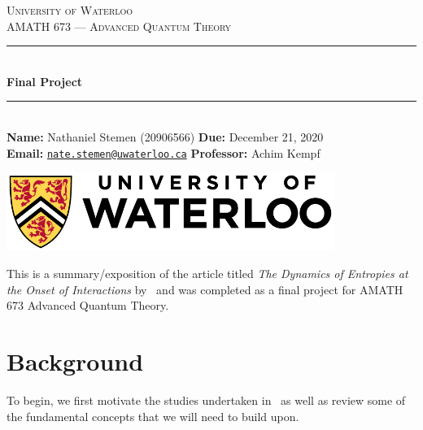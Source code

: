 \documentclass[11pt,english]{article}
\theoremstyle{definition}
\begin{document}
\begin{titlepage}
	\newcommand{\HRule}{\rule{\linewidth}{0.5mm}}

	\begin{center}

		\textsc{\LARGE University of Waterloo}\\[1.5cm]

		\textsc{\large AMATH 673 --- Advanced Quantum Theory}\\[0.75cm]

		\HRule{}\\[0.4cm]

		{\huge\bfseries Final Project}\\[0.15cm]

		\HRule{}\\[1cm]

		{\large
		\textbf{Name:} Nathaniel Stemen (20906566)\hspace{\fill} \textbf{Due:} December 21, 2020 \\
		\textbf{Email:} \href{mailto:nate.stemen@uwaterloo.ca}{\texttt{nate.stemen@uwaterloo.ca}} \hspace{\fill} \textbf{Professor:} Achim Kempf
		}

		\vfill
		\includegraphics[width=0.8\textwidth]{uwlogo.jpg}\\[1cm]
	\end{center}
\end{titlepage}

\begingroup
{}
\hypersetup{linkcolor=darkblue}
\tableofcontents
\endgroup


\vspace{0.5cm}
This is a summary/exposition of the article titled \emph{The Dynamics of Entropies at the Onset of Interactions} by~\citeauthor{dynamic-entropies} and was completed as a final project for AMATH 673 Advanced Quantum Theory.

\section{Background}
To begin, we first motivate the studies undertaken in~\cite{dynamic-entropies} as well as review some of the fundamental concepts that we will need to build upon.
\end{document}
